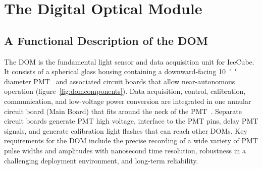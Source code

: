 \newcommand{\degC}[1]{$\unit[#1]{^\circ{C}}$}
\def\lsim{\mathrel{\rlap{\raise 0.2ex\hbox{$\,<\,$}}{\lower 0.9ex\hbox{$\,\sim\,$}}}}
\def\gsim{\mathrel{\rlap{\raise 0.2ex\hbox{$\,>\,$}}{\lower 0.9ex\hbox{$\,\sim\,$}}}}


\section{\label{sec:dom}The Digital Optical Module}

\subsection{\label{sec:dom_functional}A Functional Description of the DOM}

The DOM is the fundamental light sensor and data acquisition unit for IceCube.
It consists of a spherical glass housing 
containing a downward-facing \SI{10}{''} diameter PMT~\cite{ICECUBE:PMT}
and associated circuit boards that allow near-autonomous operation (figure~\ref{fig:domcomponents}).
Data acquisition, control, calibration, communication, and low-voltage power conversion 
are integrated in one annular circuit board (Main Board) that fits around the neck of the PMT~\cite{ICECUBE:DAQ}. 
Separate circuit boards generate PMT high voltage, interface to the PMT pins,
delay PMT signals, and generate calibration light flashes that can reach other DOMs.
Key requirements for the DOM include
the precise recording of a wide variety of PMT pulse widths and amplitudes
with nanosecond time resolution, robustness in 
a challenging deployment environment, and long-term reliability.


